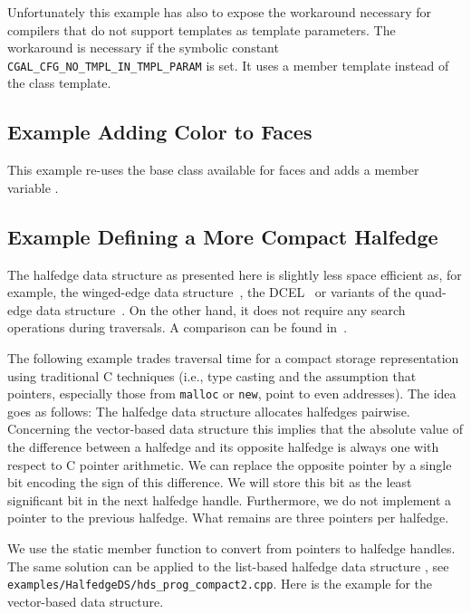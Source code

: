 Unfortunately this example has also to expose the workaround necessary
for compilers that do not support templates as template parameters.
The workaround is necessary if the symbolic constant
\verb|CGAL_CFG_NO_TMPL_IN_TMPL_PARAM| is set. It uses a member 
template instead of the class template.



\subsection{Example Adding Color to Faces}

This example re-uses the base class available for faces and adds a
member variable .


\subsection{Example Defining a More Compact Halfedge}

\begin{ccAdvanced}
  
The halfedge data structure as presented here is slightly less space
efficient as, for example, the winged-edge data
structure~\cite{b-prcv-75}, the DCEL~\cite{mp-fitcp-78} or variants of
the quad-edge data structure~\cite{gs-pmgsc-85}.  On the other hand,
it does not require any search operations during traversals. A
comparison can be found in~\cite{k-ugpdd-99}.

The following example trades traversal time for a compact storage
representation using traditional C techniques (i.e., type casting and
the assumption that pointers, especially those from {\tt malloc} or
{\tt new}, point to even addresses). The idea goes as follows: The
halfedge data structure allocates halfedges pairwise.  Concerning the
vector-based data structure this implies that the absolute value of
the difference between a halfedge and its opposite halfedge is always
one with respect to C pointer arithmetic. We can replace the opposite
pointer by a single bit encoding the sign of this difference.  We will
store this bit as the least significant bit in the next halfedge
handle.  Furthermore, we do not implement a pointer to the previous
halfedge. What remains are three pointers per halfedge. 

We use the static member function  to convert
from pointers to halfedge handles. The same solution can be applied to
the list-based halfedge data structure ,
see \texttt{examples/HalfedgeDS/hds\_prog\_compact2.cpp}. Here is the
example for the vector-based data structure.


\end{ccAdvanced}

